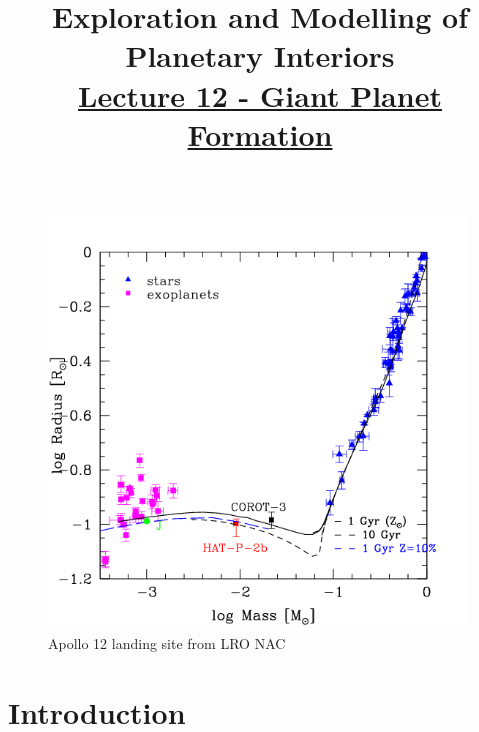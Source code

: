 \documentclass[12pt]{article} %
\title{\large{\vspace{-5ex}\textbf{Exploration and Modelling of Planetary Interiors}}\newline\\{\textbf{\underline{Lecture 12 - Giant Planet Formation}}}\vspace{-7ex}}
\author{}
\date{} %
\begin{document}
\begingroup
\let\center\flushleft
\let\endcenter\endflushleft
\maketitle
\endgroup

\begingroup
\let\cleardoublepage\relax
\let\clearpage\relax
\tableofcontents
\endgroup

\begin{figure}[!htbp]
\begin{center}
 \includegraphics[width=0.99\textwidth,keepaspectratio=true]{./images/physics_stackexchange_com_questions_165283_gas_giant_six_times_more_massive}
 \caption{Apollo 12 landing site from LRO NAC}
 \label{A12_zoom_nomenclature}
\end{center}
\end{figure}

\section{Introduction}\vspace{-2ex}\titlerule[1pt]\bigskip
\end{document}
